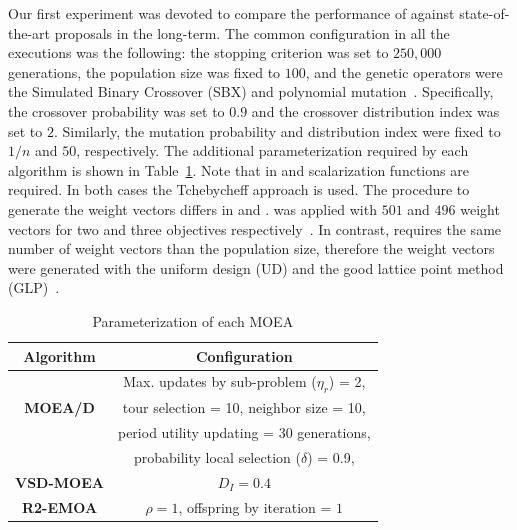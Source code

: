 Our first experiment was devoted to compare the performance of \VSDMOEA{} against state-of-the-art proposals in the long-term.
%
The common configuration in all the executions was the following: the stopping criterion was set to $250,000$ generations, 
the population size was fixed to $100$, and the genetic operators were the Simulated Binary Crossover (SBX) and polynomial 
mutation~\cite{Joel:SBX1994, Joel:Mutation}.
%
Specifically, the crossover probability was set to $0.9$ and the crossover distribution index was
set to $2$.
%
Similarly, the mutation probability and distribution index were fixed to $1/n$ and $50$, respectively.
%
The additional parameterization required by each algorithm is shown in Table~\ref{tab:Parametrization}.
%
Note that in \MOEAD{} and \RMOEA{} scalarization functions are required.
%
In both cases the Tchebycheff approach is used.
%
The procedure to generate the weight vectors differs in \MOEAD{} and \RMOEA{}.
%
\RMOEA{} was applied with $501$ and $496$ weight vectors for two and three objectives respectively~\cite{trautmann2013r2}.
%
In contrast, \MOEAD{} requires the same number of weight vectors than the population size, therefore the weight vectors were generated with the uniform design (UD) and the good lattice point method (GLP)~\cite{Joel:MOEAD_Uniform_Design, Joel:Kuhn_Munkres}.



%
\begin{table}[t]
\centering
\caption{Parameterization of each MOEA}
\label{tab:Parametrization}
\begin{tabular}{c|c}
\hline
\textbf{Algorithm} & \textbf{Configuration} \\ \hline
\multirow{3}{*}{\textbf{MOEA/D}} &Max. updates by sub-problem ($\eta_r$) = 2, \\
 & tour selection = 10,   neighbor size = 10, \\
 & period utility updating = 30 generations, \\ 
 & probability local selection ($\delta$) = 0.9,\\ \hline
\textbf{VSD-MOEA} & $D_I=0.4$ \\ \hline
\textbf{R2-EMOA} & $\rho=1$, offspring by iteration = $1$ \\ \hline
\end{tabular}
\end{table}




